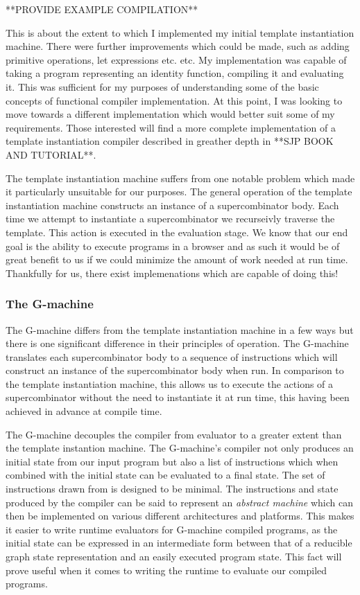 \documentclass[11pt]{article}
\begin{document}
**PROVIDE EXAMPLE COMPILATION**

This is about the extent to which I implemented my initial
template instantiation machine. There were further 
improvements which could be made, such as adding primitive
operations, let expressions etc. etc. My implementation was
capable of taking a program representing an identity 
function, compiling it and evaluating it. This was 
sufficient for my purposes of understanding some of the
basic concepts of functional compiler implementation. At
this point, I was looking to move towards a different
implementation which would better suit some of my 
requirements. Those interested will find a more complete
implementation of a template instantiation compiler 
described in greather depth in **SJP BOOK AND TUTORIAL**.

The template instantiation machine suffers from one notable
problem which made it particularly unsuitable for our
purposes. The general operation of the template instantiation
machine constructs an instance of a supercombinator body.
Each time we attempt to instantiate a supercombinator we
recurseivly traverse the template. This action is executed
in the evaluation stage. We know that our end goal is the
ability to execute programs in a browser and as such it would
be of great benefit to us if we could minimize the amount of
work needed at run time. Thankfully for us, there exist
implemenations which are capable of doing this!

\subsubsection{The G-machine}
The G-machine differs from the template instantiation machine
in a few ways but there is one significant difference in 
their principles of operation. The G-machine translates each
supercombinator body to a sequence of instructions which will
construct an instance of the supercombinator body when run.
In comparison to the template instantiation machine, this
allows us to execute the actions of a supercombinator without
the need to instantiate it at run time, this having been
achieved in advance at compile time. 

The G-machine decouples the compiler from evaluator to a
greater extent than the template instantion machine. The
G-machine's compiler not only produces an initial state from
our input program but also a list of instructions which when
combined with the initial state can be evaluated to a final
state. The set of instructions drawn from is designed to be
minimal. The instructions and state produced
by the compiler can be said to represent an \emph{abstract
machine} which can then be implemented on various different
architectures and platforms. This makes it easier to write
runtime evaluators for G-machine compiled programs, as the
initial state can be expressed in an intermediate form 
between that of a reducible graph state representation 
and an easily executed program state. This fact will prove
useful when it comes to writing the runtime to evaluate
our compiled programs.
\end{document}
